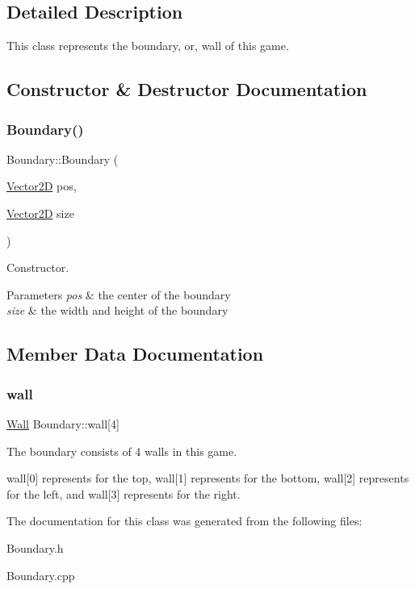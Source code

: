 \subsection{Detailed Description}
This class represents the boundary, or, wall of this game. 

\subsection{Constructor \& Destructor Documentation}
\mbox{\label{class_boundary_a2b9f2570842c4216442993d67759a6c3}} 
\subsubsection{\texorpdfstring{Boundary()}{Boundary()}}
{\footnotesize\ttfamily Boundary\+::\+Boundary (\begin{DoxyParamCaption}\item[{\mbox{\hyperlink{struct_vector2_d}{Vector2D}}}]{pos,  }\item[{\mbox{\hyperlink{struct_vector2_d}{Vector2D}}}]{size }\end{DoxyParamCaption})}



Constructor. 


\begin{DoxyParams}{Parameters}
{\em pos} & the center of the boundary \\
\hline
{\em size} & the width and height of the boundary \\
\hline
\end{DoxyParams}


\subsection{Member Data Documentation}
\mbox{\label{class_boundary_a0e79523250fad91c026018059f8aeae5}} 
\subsubsection{\texorpdfstring{wall}{wall}}
{\footnotesize\ttfamily \mbox{\hyperlink{class_wall}{Wall}} Boundary\+::wall\mbox{[}4\mbox{]}\hspace{0.3cm}{\ttfamily [private]}}



The boundary consists of 4 walls in this game. 

wall\mbox{[}0\mbox{]} represents for the top, wall\mbox{[}1\mbox{]} represents for the bottom, wall\mbox{[}2\mbox{]} represents for the left, and wall\mbox{[}3\mbox{]} represents for the right. 

The documentation for this class was generated from the following files\+:\begin{DoxyCompactItemize}
\item 
Boundary.\+h\item 
Boundary.\+cpp\end{DoxyCompactItemize}
